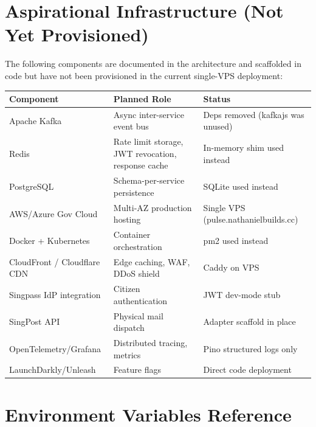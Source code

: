 \documentclass[12pt,a4paper]{article}
\begin{document}
\section{Aspirational Infrastructure (Not Yet Provisioned)}
\label{sec:aspirational}

The following components are documented in the architecture and scaffolded in code
but have not been provisioned in the current single-VPS deployment:

\begin{tabular}{@{}lll@{}}
\toprule
\textbf{Component} & \textbf{Planned Role} & \textbf{Status} \\
\midrule
Apache Kafka       & Async inter-service event bus & Deps removed (kafkajs was unused) \\
Redis              & Rate limit storage, JWT revocation, response cache & In-memory shim used instead \\
PostgreSQL         & Schema-per-service persistence & SQLite used instead \\
AWS/Azure Gov Cloud & Multi-AZ production hosting & Single VPS (pulse.nathanielbuilds.cc) \\
Docker + Kubernetes & Container orchestration & pm2 used instead \\
CloudFront / Cloudflare CDN & Edge caching, WAF, DDoS shield & Caddy on VPS \\
Singpass IdP integration & Citizen authentication & JWT dev-mode stub \\
SingPost API        & Physical mail dispatch & Adapter scaffold in place \\
OpenTelemetry/Grafana & Distributed tracing, metrics & Pino structured logs only \\
LaunchDarkly/Unleash & Feature flags & Direct code deployment \\
\bottomrule
\end{tabular}

\section{Environment Variables Reference}
\label{sec:env}
\end{document}

